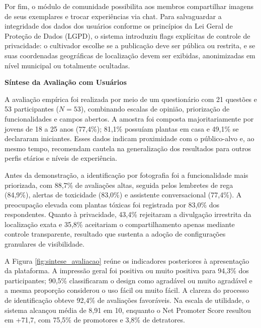 \documentclass[12pt,a4paper]{article}
\begin{document}
Por fim, o módulo de comunidade possibilita aos membros compartilhar imagens de seus exemplares e trocar experiências via chat. Para salvaguardar a integridade dos dados dos usuários conforme os princípios da Lei Geral de Proteção de Dados (LGPD), o sistema introduziu flags explícitas de controle de privacidade: o cultivador escolhe se a publicação deve ser pública ou restrita, e se suas coordenadas geográficas de localização devem ser exibidas, anonimizadas em nível municipal ou totalmente ocultadas.

\vspace{0.3cm}
\noindent \textbf{Síntese da Avaliação com Usuários}\par
\vspace{0.1cm}

A avaliação empírica foi realizada por meio de um questionário com 21 questões e 53 participantes ($N = 53$), combinando escalas de opinião, priorização de funcionalidades e campos abertos. A amostra foi composta majoritariamente por jovens de 18 a 25 anos (77,4\%); 81,1\% possuíam plantas em casa e 49,1\% se declararam iniciantes. Esses dados indicam proximidade com o público-alvo e, ao mesmo tempo, recomendam cautela na generalização dos resultados para outros perfis etários e níveis de experiência.

Antes da demonstração, a identificação por fotografia foi a funcionalidade mais priorizada, com 88,7\% de avaliações altas, seguida pelos lembretes de rega (84,9\%), alertas de toxicidade (83,0\%) e assistente conversacional (77,4\%). A preocupação elevada com plantas tóxicas foi registrada por 83,0\% dos respondentes. Quanto à privacidade, 43,4\% rejeitaram a divulgação irrestrita da localização exata e 35,8\% aceitariam o compartilhamento apenas mediante controle transparente, resultado que sustenta a adoção de configurações granulares de visibilidade.

A Figura \ref{fig:sintese_avaliacao} reúne os indicadores posteriores à apresentação da plataforma. A impressão geral foi positiva ou muito positiva para 94,3\% dos participantes; 90,5\% classificaram o design como agradável ou muito agradável e a mesma proporção considerou o uso fácil ou muito fácil. A clareza do processo de identificação obteve 92,4\% de avaliações favoráveis. Na escala de utilidade, o sistema alcançou média de 8,91 em 10, enquanto o Net Promoter Score resultou em +71,7, com 75,5\% de promotores e 3,8\% de detratores.
\end{document}
